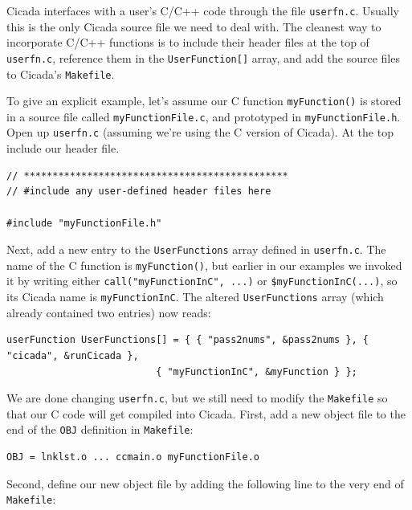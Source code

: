 \documentclass{article}
\newenvironment{code}{
       \begin{list}{}{
               \setlength{\leftmargin}{.4in}
               \setlength{\rightmargin}{0in}
               \setlength{\topsep}{.2in}
       }
       \small
       \item[] }
       { \end{list}   }
\begin{document}
Cicada interfaces with a user's C/C++ code through the file \verb#userfn.c#.  Usually this is the only Cicada source file we need to deal with.  The cleanest way to incorporate C/C++ functions is to include their header files at the top of \verb#userfn.c#, reference them in the \verb#UserFunction[]# array, and add the source files to Cicada's \verb#Makefile#.

To give an explicit example, let's assume our C function \verb#myFunction()# is stored in a source file called \verb#myFunctionFile.c#, and prototyped in \verb#myFunctionFile.h#.  Open up \verb#userfn.c# (assuming we're using the C version of Cicada).  At the top include our header file.

\begin{code} \begin{verbatim}
// **********************************************
// #include any user-defined header files here

#include "myFunctionFile.h"
\end{verbatim} \end{code}

Next, add a new entry to the \verb#UserFunctions# array defined in \verb#userfn.c#.  The name of the C function is \verb#myFunction()#, but earlier in our examples we invoked it by writing either \verb#call("myFunctionInC", ...)# or \verb#$myFunctionInC(...)#, so its Cicada name is \verb#myFunctionInC#.  The altered \verb#UserFunctions# array (which already contained two entries) now reads:

\begin{code} \begin{verbatim}
userFunction UserFunctions[] = { { "pass2nums", &pass2nums }, { "cicada", &runCicada },
                          { "myFunctionInC", &myFunction } };
\end{verbatim} \end{code}

We are done changing \verb#userfn.c#, but we still need to modify the \verb#Makefile# so that our C code will get compiled into Cicada.  First, add a new object file to the end of the \verb#OBJ# definition in \verb#Makefile#:

\begin{code} \begin{verbatim}
OBJ = lnklst.o ... ccmain.o myFunctionFile.o
\end{verbatim} \end{code}

\noindent Second, define our new object file by adding the following line to the very end of \verb#Makefile#:
\end{document}
